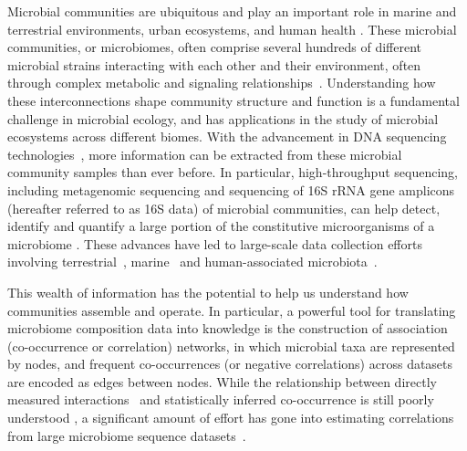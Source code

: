 \documentclass[letterpaper,12pt]{article}
\begin{document}
Microbial communities are ubiquitous and play an important role in marine and terrestrial environments, urban ecosystems, and human health \cite{lima-mendezDeterminantsCommunityStructure2015a,Thompson2017,royo-llonchCompendium530Metagenomeassembled2021,tedersooFungalBiogeographyGlobal2014,dankoGlobalMetagenomicMap2021,mclellanMicrobiomeUrbanWaters2015,HumanMicrobiomeProjectConsortium2012}.
  These microbial communities, or microbiomes, often comprise several hundreds of different microbial strains interacting with each other and their environment, often through complex metabolic and signaling relationships~\cite{zelezniakMetabolicDependenciesDrive2015,Ghoul2016,coyteUnderstandingCompetitionCooperation2019,DSouza2018}.
  Understanding how these interconnections shape community structure and function is a fundamental challenge in microbial ecology, and has applications in the study of microbial ecosystems across different biomes.
  With the advancement in DNA sequencing technologies~\cite{huNextgenerationSequencingTechnologies2021,buermansNextGenerationSequencing2014,Narihiro2017},  more information can be extracted from these microbial community samples than ever before.
  In particular, high-throughput sequencing, including metagenomic sequencing and sequencing of 16S rRNA gene amplicons (hereafter referred to as 16S data) of microbial communities, can help detect, identify and quantify a large portion of the constitutive microorganisms of a microbiome \cite{ju16SRRNAGene2015,Jovel2016,quinceShotgunMetagenomicsSampling2017,sedlarBioinformaticsStrategiesTaxonomy2017}.
  These advances have led to large-scale data collection efforts involving terrestrial~\cite{Thompson2017,gilbertMeetingReportTerabase2010,tedersooFungalBiogeographyGlobal2014}, marine~\cite{lima-mendezDeterminantsCommunityStructure2015a,royo-llonchCompendium530Metagenomeassembled2021} and human-associated microbiota~\cite{HumanMicrobiomeProjectConsortium2012,proctorIntegrativeHumanMicrobiome2019,Lloyd-Price2016}.

 This wealth of information has the potential to help us understand how communities assemble and operate.
 In particular, a powerful tool for translating microbiome composition data into knowledge is the construction of association (co-occurrence or correlation) networks, in which  microbial taxa are represented by nodes, and frequent co-occurrences (or negative correlations) across datasets are encoded as edges between nodes.
 While the relationship between directly measured interactions~\cite{lubbeExometabolomicAnalysisCrossFeeding2017,Jian2020,Hsu2019} and statistically inferred co-occurrence is still poorly understood \cite{Zuniga2017,Rottjers2018}, a significant amount of effort has gone into estimating correlations from large microbiome sequence datasets~\cite{faustMicrobialCooccurrenceRelationships2012,leeCrosskingdomCooccurrenceNetworks2022,faustMicrobialInteractionsNetworks2012a,maEarthMicrobialCooccurrence2020a}.
\end{document}
